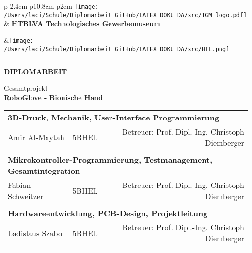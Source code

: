 \documentclass[titlepage,12pt,twoside]{article}
\begin{document}


\begin{titlepage}

	\begin{center}
	\begin{tabular}{p {2.4cm} p{10.8cm} p{2cm}}
	\texttt{[image: /Users/laci/Schule/Diplomarbeit\_GitHub/LATEX\_DOKU\_DA/src/TGM\_logo.pdf]}& \large{{\textbf{HTBLVA Technologisches Gewerbemuseum}}}\par\par{}&\texttt{[image: /Users/laci/Schule/Diplomarbeit\_GitHub/LATEX\_DOKU\_DA/src/HTL.png]}\\
	\end{tabular}
	\noindent\rule{1.1\textwidth}{1pt} 
	\end{center}
	
	\begin{center}
	
	\vspace*{1cm}
	\LARGE
	\textbf{DIPLOMARBEIT}
	
	\vspace{1.7cm}
	\normalsize
	Gesamtprojekt\\
	\LARGE
	\textbf{RoboGlove - Bionische Hand}\\
	\end{center}
	
	\vspace{1.7cm}
	
	\normalsize 
	\large
	
	\begin{tabular}{llr} 
	\multicolumn{3}{l}{\large{ \textbf{3D-Druck, Mechanik, User-Interface Programmierung}}} \\
	\large{Amir Al-Maytah} & \hspace{0.5cm}\large{5BHEL}\hspace{0.5cm} &  \large{Betreuer: Prof. Dipl.-Ing. Christoph Diemberger}\\
	 \\
	\multicolumn{3}{l}{\large{ \textbf{Mikrokontroller-Programmierung, Testmanagement, Gesamtintegration}}} \\
	\large{Fabian Schweitzer} & \hspace{0.5cm}\large{5BHEL}\hspace{0.5cm} &  \large{Betreuer: Prof. Dipl.-Ing. Christoph Diemberger}\\
	 \\
	\multicolumn{3}{l}{\large{ \textbf{Hardwareentwicklung, PCB-Design, Projektleitung}}} \\
	\large{Ladislaus Szabo} & \hspace{0.5cm}\large{5BHEL}\hspace{0.5cm} &  \large{Betreuer: Prof. Dipl.-Ing. Christoph Diemberger}\\
	 \\
	

\end{tabular}
\end{titlepage}
\end{document}
